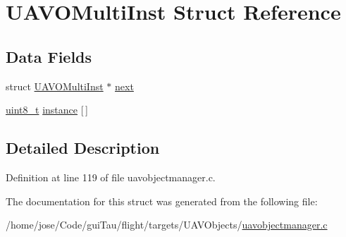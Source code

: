 \hypertarget{struct_u_a_v_o_multi_inst}{\section{U\-A\-V\-O\-Multi\-Inst Struct Reference}
\label{struct_u_a_v_o_multi_inst}
}
\subsection*{Data Fields}
\begin{DoxyCompactItemize}
\item 
struct \hyperlink{struct_u_a_v_o_multi_inst}{U\-A\-V\-O\-Multi\-Inst} $\ast$ \hyperlink{group___u_a_v_ga571693c984fd7e8e845fe57fca2d21d9}{next}
\item 
\hyperlink{stdint_8h_aba7bc1797add20fe3efdf37ced1182c5}{uint8\-\_\-t} \hyperlink{group___u_a_v_gab48732994d9762f9493940dc57e60f8b}{instance} \mbox{[}$\,$\mbox{]}
\end{DoxyCompactItemize}


\subsection{Detailed Description}


Definition at line 119 of file uavobjectmanager.\-c.



The documentation for this struct was generated from the following file\-:\begin{DoxyCompactItemize}
\item 
/home/jose/\-Code/gui\-Tau/flight/targets/\-U\-A\-V\-Objects/\hyperlink{uavobjectmanager_8c}{uavobjectmanager.\-c}\end{DoxyCompactItemize}
